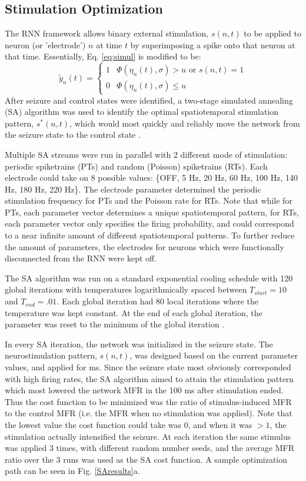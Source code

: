 \documentclass[11pt,a4paper,final]{article}
\begin{document}
\subsection{Stimulation Optimization}
The RNN framework allows binary external stimulation, $s(n,t)$ to be applied to neuron (or 'electrode') $n$ at time $t$ by superimposing a spike onto that neuron at that time.
Essentially, Eq. \ref{eq:simul} is modified to be:
\begin{equation}
\tilde{y}_n(t) =
\begin{cases}
1   & \Phi(\eta_n(t),\sigma) > u \text{ or } s(n,t)=1 \\
0   & \Phi(\eta_n(t),\sigma) \leq u
\end{cases}
\label{eq:stim}
\end{equation}
After seizure and control states were identified, a two-stage simulated annealing (SA) algorithm was used to identify the optimal spatiotemporal stimulation pattern, $s^*(n,t)$, which would most quickly and reliably move the network from the seizure state to the control state \citep{kirkpatrick83}.

Multiple SA streams were run in parallel with 2 different mode of stimulation: periodic spiketrains (PTs) and random (Poisson) spiketrains (RTs).
Each electrode could take on 8 possible values: \{OFF, 5 Hz, 20 Hz, 60 Hz, 100 Hz, 140 Hz, 180 Hz, 220 Hz\}.
The electrode parameter determined the periodic stimulation frequency for PTs and the Poisson rate for RTs.
Note that while for PTs, each parameter vector determines a unique spatiotemporal pattern, for RTs, each parameter vector only specifies the firing probability, and could correspond to a near infinite amount of different spatiotemporal patterns.
To further reduce the amount of parameters, the electrodes for neurons which were functionally disconnected from the RNN were kept off.

The SA algorithm was run on a standard exponential cooling schedule with 120 global iterations with temperatures logarithmically spaced between $T_{start}=10$ and $T_{end}=.01$.
Each global iteration had 80 local iterations where the temperature was kept constant.
At the end of each global iteration, the parameter was reset to the minimum of the global iteration \citep{henderson03}.

In every SA iteration, the network was initialized in the seizure state.
The neurostimulation pattern, $s(n,t)$, was designed based on the current parameter values, and applied for \len ms.
Since the seizure state most obviously corresponded with high firing rates, the SA algorithm aimed to attain the stimulation pattern which most lowered the network MFR in the 100 ms after stimulation ended.
Thus the cost function to be minimized was the ratio of stimulus-induced MFR to the control MFR (i.e. the MFR when no stimulation was applied).
Note that the lowest value the cost function could take was 0, and when it was $>1$, the stimulation actually intensified the seizure.
At each iteration the same stimulus was applied 3 times, with different random number seeds, and the average MFR ratio over the 3 runs was used as the SA cost function.
A sample optimization path can be seen in Fig. \ref{SAresults}a.
\end{document}
